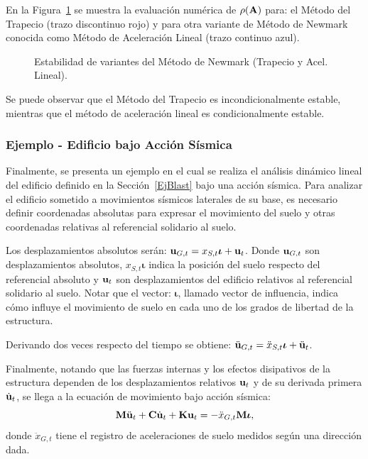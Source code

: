 En la Figura~\ref{fig:stabnewmark} se muestra la evaluación numérica de $\rho({\bf A})$ para: el Método del Trapecio (trazo discontinuo rojo) y para otra variante de Método de Newmark conocida como Método de Aceleración Lineal (trazo continuo azul). %

\begin{figure}[htb]
	\centering
	\resizebox{.75\linewidth}{!}{}
	\caption{Estabilidad de variantes del Método de Newmark (Trapecio y Acel. Lineal).}
	\label{fig:stabnewmark}
\end{figure}

Se puede observar que el Método del Trapecio es incondicionalmente estable, mientras que el método de aceleración lineal es condicionalmente estable.

\subsubsection{Ejemplo - Edificio bajo Acción Sísmica}

Finalmente, se presenta un ejemplo en el cual se realiza el análisis dinámico lineal del edificio definido en la Sección~\ref{EjBlast} bajo una acción sísmica. %
%
Para analizar el edificio sometido a movimientos sísmicos laterales de su base, es necesario definir coordenadas absolutas para expresar el movimiento del suelo y otras coordenadas relativas al referencial solidario al suelo.

Los desplazamientos absolutos serán: ${\bf u}_{G,t}=x_{S,t}\boldsymbol{\iota} + {\bf u}_{t}$. Donde ${\bf u}_{G,t}$ son desplazamientos absolutos, $x_{S,t}\boldsymbol{\iota}$ indica la posición del suelo respecto del referencial absoluto y ${\bf u}_t$ son desplazamientos del edificio relativos al referencial solidario al suelo. Notar que el vector: $\boldsymbol{\iota}$, llamado vector de influencia, indica cómo influye el movimiento de suelo en cada uno de los grados de libertad de la estructura.

Derivando dos veces respecto del tiempo se obtiene: $\ddot{{\bf u}}_{G,t}=\ddot{x}_{S,t}\boldsymbol{\iota} + \ddot{{\bf u}}_{t}$. 

Finalmente, notando que las fuerzas internas y los efectos disipativos de la estructura dependen de los desplazamientos relativos ${\bf u}_t$ y de su derivada primera $\dot{{\bf u}}_t$, se llega a la ecuación de movimiento bajo acción sísmica:
%
\begin{equation}\label{EcMovLinSismo}
{\bf M} \ddot{{\bf u}}_t + {\bf C} \dot{{\bf u}}_t + {\bf K} {\bf u}_t = -\ddot{x}_{G,t}{\bf M} \boldsymbol{\iota},
\end{equation}
%
donde $\ddot{x}_{G,t}$ tiene el registro de aceleraciones de suelo medidos según una dirección dada.

